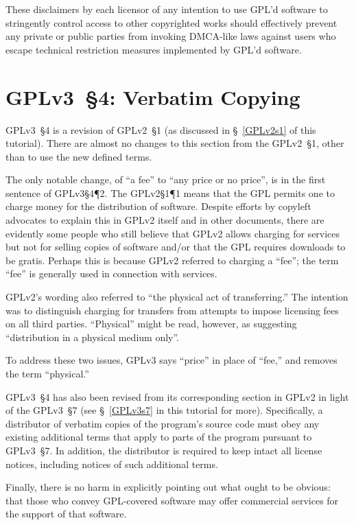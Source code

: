 These disclaimers by each licensor of any intention to use GPL'd software to
stringently control access to other copyrighted works should effectively
prevent any private or public parties from invoking DMCA-like laws against
users who escape technical restriction measures implemented by GPL'd
software.

\section{GPLv3~\S4: Verbatim Copying}
\label{GPLv3s4}

GPLv3~\S4 is a revision of GPLv2~\S1 (as discussed in \S~\ref{GPLv2s1} of
this tutorial).   There are almost no changes to this section from the
GPLv2~\S1, other than to use the new defined terms.

The only notable change, of ``a fee'' to ``any price or no price'', is in the
first sentence of GPLv3\S4\P2.  The GPLv2\S1\P1 means that the GPL permits
one to charge money for the distribution of software.  Despite efforts by
copyleft advocates to explain this in GPLv2 itself and in other documents,
there are evidently some people who still believe that GPLv2 allows charging
for services but not for selling copies of software and/or that the GPL
requires downloads to be gratis.  Perhaps this is because GPLv2 referred to
charging a ``fee''; the term ``fee'' is generally used in connection with
services.

GPLv2's wording also referred to ``the physical act of transferring.''  The
intention was to distinguish charging for transfers from attempts to impose
licensing fees on all third parties.  ``Physical'' might be read, however, as
suggesting ``distribution in a physical medium only''.

To address these two issues, GPLv3 says ``price'' in place of ``fee,'' and
removes the term ``physical.''

GPLv3~\S4 has also been revised from its corresponding section in GPLv2 in
light of the GPLv3~\S7 (see \S~\ref{GPLv3s7} in this tutorial for more).
Specifically, a distributor of verbatim copies of the program's source code
must obey any existing additional terms that apply to parts of the program
pursuant to GPLv3~\S7.  In addition, the distributor is required to keep
intact all license notices, including notices of such additional terms.

Finally, there is no harm in explicitly pointing out what ought to be
obvious: that those who convey GPL-covered software may offer commercial
services for the support of that software.

